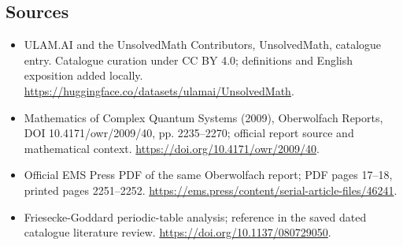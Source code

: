 \documentclass[11pt]{article}
\begin{document}
\subsection{Sources}
\begin{itemize}
\item[\hypertarget{source:statement:1}{S1}] ULAM.AI and the UnsolvedMath Contributors, UnsolvedMath, catalogue entry. Catalogue curation under CC BY 4.0; definitions and English exposition added locally.
\url{https://huggingface.co/datasets/ulamai/UnsolvedMath}.
\item[\hypertarget{source:statement:2}{S2}] Mathematics of Complex Quantum Systems (2009), Oberwolfach Reports, DOI 10.4171/owr/2009/40, pp. 2235--2270; official report source and mathematical context.
\url{https://doi.org/10.4171/owr/2009/40}.
\item[\hypertarget{source:statement:3}{S3}] Official EMS Press PDF of the same Oberwolfach report; PDF pages 17--18, printed pages 2251--2252.
\url{https://ems.press/content/serial-article-files/46241}.
\item[\hypertarget{source:statement:4}{S4}] Friesecke-Goddard periodic-table analysis; reference in the saved dated catalogue literature review.
\url{https://doi.org/10.1137/080729050}.
\end{itemize}
\label{end:statement}
\end{document}
